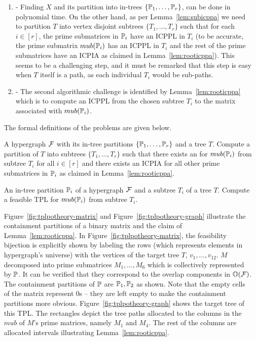 \begin{enumerate}

\item \label{it:challenge1} \FOCPS - Finding $X$ and its partition into
  in-trees $\{\mathbb P_1,\ldots,\mathbb P_r\}$, can be done in polynomial time.
  On the other hand, as per Lemma~\ref{lem:subicppa} we need to
  partition $T$ into vertex disjoint subtrees $\{T_1, \ldots, T_r\}$
  such that for each $i \in [r]$, the prime submatrices in $\mathbb P_i$
  have an ICPPL in $T_i$ (to be accurate, the prime submatrix
  $mub(\mathbb P_i)$ has an ICPPL in $T_i$ and the rest of the prime
  submatrices have an ICPIA as claimed in Lemma~\ref{lem:rooticppa}).
  This seems to be a challenging step, and it must be remarked that
  this step is easy when $T$ itself is a path, as each individual
  $T_i$ would be sub-paths.
\item \label{it:challenge2} \FMFT - The second algorithmic challenge is
  identified by Lemma~\ref{lem:rooticppa} which is to compute an ICPPL
  from the chosen subtree $T_i$ to the matrix associated with
  $mub(\mathbb P_i)$.
\end{enumerate}

The formal definitions of the problems are given below.

\begin{problemdef}{\FOCPS}{A hypergraph ${\cal F}$ with its in-tree
    partitions $\{\mathbb P_1,\ldots,\mathbb P_r\}$ and
    a tree $T$.}
  Compute a partition of $T$ into subtrees $\{T_1, \ldots, T_r\}$ such
  that there exists an \ICPPL for $mub(\mathbb P_i)$ from subtree
  $T_i$ for all $i \in [r]$ and there exists an ICPIA for all other
  prime submatrices in $\mathbb P_i$ as claimed in Lemma~\ref{lem:rooticppa}.
\end{problemdef}

\begin{problemdef}{\FMFT}{An in-tree partition $\mathbb P_i$ of a hypergraph
    ${\cal F}$ and a subtree $T_i$ of a tree $T$.}
  Compute a feasible TPL for $mub(\mathbb P_i)$ from subtree $T_i$.
\end{problemdef}


Figure~\ref{fig:tplpotheory-matrix} and
Figure~\ref{fig:tplpotheory-graph} illustrate the containment
partitions of a binary matrix and the claim of
Lemma~\ref{lem:rooticppa}. In Figure~\ref{fig:tplpotheory-matrix}, the
feasibility bijection is explicitly shown by labeling the rows (which
represents elements in hypergraph's universe) with the vertices of the
target tree $T$, $v_1, \ldots, v_{12}$.  $M$ decomposed into prime
submatrices $M_1, \ldots, M_6$ which is collectively represented by
$\mathbb P$. It can be verified that they correspond to the overlap
components in $\mathbb O({\cal F})$. The containment partitions of $\mathbb P$ are
$\mathbb P_1, \mathbb P_2$ as shown. Note that the empty cells of the matrix
represent 0s -- they are left empty to make the containment partitions
more obvious.  Figure~\ref{fig:tplpotheory-graph} shows the target
tree of this TPL. The rectangles depict the tree paths allocated to
the columns in the $mub$ of $M$'s prime matrices, namely $M_1$ and
$M_4$. The rest of the columns are allocated intervals illustrating
Lemma~\ref{lem:rooticppa}.  

